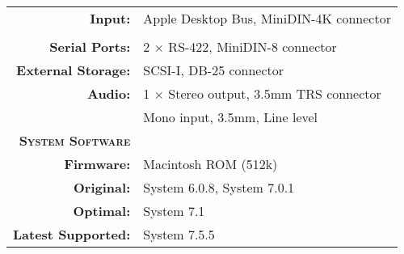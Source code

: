 \begin{tabular}{ r p{6in} }
\\
\textbf{Input:} & Apple Desktop Bus, MiniDIN-4K connector \\
\\
\textbf{Serial Ports:} & 2 \(\times\) RS-422, MiniDIN-8 connector \\
\textbf{External Storage:} & SCSI-I, DB-25 connector \\
\textbf{Audio:} & 1 \(\times\) Stereo output, 3.5mm TRS connector \\
~ & Mono input, 3.5mm, Line level
\\
\textbf{\textsc{System Software}} & ~ \\
\textbf{Firmware:} & Macintosh ROM (512k) \\
\textbf{Original:} & System 6.0.8, System 7.0.1 \\
\textbf{Optimal:} & System 7.1 \\
\textbf{Latest Supported:} & System 7.5.5 \\
\end{tabular}
